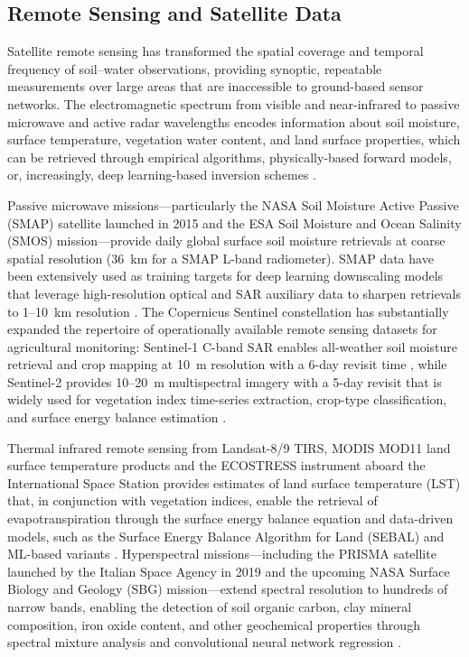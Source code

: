 \documentclass[land,review,accept,pdftex,oneauthor]{Definitions/mdpi}
\begin{document}
\subsection{Remote Sensing and Satellite Data}

Satellite remote sensing has transformed the spatial coverage and temporal frequency of soil--water observations, providing synoptic, repeatable measurements over large areas that are inaccessible to ground-based sensor networks. The electromagnetic spectrum from visible and near-infrared to passive microwave and active radar wavelengths encodes information about soil moisture, surface temperature, vegetation water content, and land surface properties, which can be retrieved through empirical algorithms, physically-based forward models, or, increasingly, deep learning-based inversion schemes \citep{petropoulos2015}.

Passive microwave missions---particularly the NASA Soil Moisture Active Passive (SMAP) satellite launched in 2015 and the ESA Soil Moisture and Ocean Salinity (SMOS) mission---provide daily global surface soil moisture retrievals at coarse spatial resolution (36~km for a SMAP L-band radiometer). SMAP data have been extensively used as training targets for deep learning downscaling models that leverage high-resolution optical and SAR auxiliary data to sharpen retrievals to 1--10~km resolution \citep{Fang2017,FangShen2020}. The Copernicus Sentinel constellation has substantially expanded the repertoire of operationally available remote sensing datasets for agricultural monitoring: Sentinel-1 C-band SAR enables all-weather soil moisture retrieval and crop mapping at 10~m resolution with a 6-day revisit time \citep{hajj2017soil}, while Sentinel-2 provides 10--20~m multispectral imagery with a 5-day revisit that is widely used for vegetation index time-series extraction, crop-type classification, and surface energy balance estimation \citep{Lemenkova202405}.

Thermal infrared remote sensing from Landsat-8/9 TIRS, MODIS MOD11 land surface temperature products and the ECOSTRESS instrument aboard the International Space Station provides estimates of land surface temperature (LST) that, in conjunction with vegetation indices, enable the retrieval of evapotranspiration through the surface energy balance equation and data-driven models, such as the Surface Energy Balance Algorithm for Land (SEBAL) and ML-based variants \citep{allen1998crop,song2022deep,Lemenkova202221}. Hyperspectral missions---including the PRISMA satellite launched by the Italian Space Agency in 2019 and the upcoming NASA Surface Biology and Geology (SBG) mission---extend spectral resolution to hundreds of narrow bands, enabling the detection of soil organic carbon, clay mineral composition, iron oxide content, and other geochemical properties through spectral mixture analysis and convolutional neural network regression \citep{hong2021multimodal}.
\end{document}

